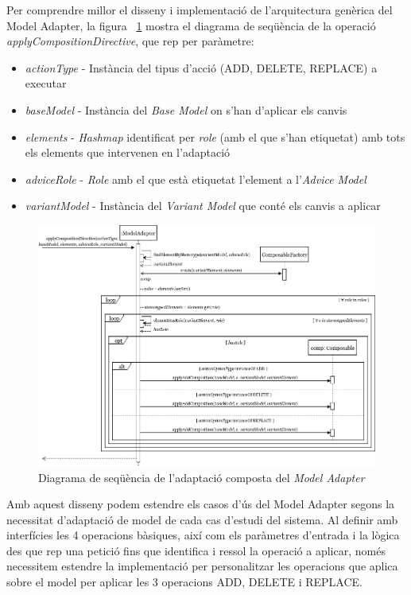 Per comprendre millor el disseny i implementació de l'arquitectura genèrica del Model Adapter, la figura ~\ref{fig:Figura30} mostra el diagrama de seqüència de la operació \textit{applyCompositionDirective}, que rep per paràmetre:

\begin{itemize}
\item \textit{actionType} - Instància del tipus d'acció (ADD, DELETE, REPLACE) a executar
\item \textit{baseModel} - Instància del \textit{Base Model} on s'han d'aplicar els canvis
\item \textit{elements} - \textit{Hashmap} identificat per \textit{role} (amb el que s'han etiquetat) amb tots els elements que intervenen en l'adaptació
\item \textit{adviceRole} - \textit{Role} amb el que està etiquetat l'element a l'\textit{Advice Model}
\item \textit{variantModel} - Instància del \textit{Variant Model} que conté els canvis a aplicar
\end{itemize}

\begin{figure}
\centering
\includegraphics[width=14cm]{Figures/Figure30}
\decoRule
\caption{Diagrama de seqüència de l'adaptació composta del \textit{Model Adapter}}
\label{fig:Figura30}
\end{figure}

Amb aquest disseny podem estendre els casos d'ús del Model Adapter segons la necessitat d'adaptació de model de cada cas d'estudi del sistema. Al definir amb interfícies les 4 operacions bàsiques, així com els paràmetres d'entrada i la lògica des que rep una petició fins que identifica i ressol la operació a aplicar, només necessitem estendre la implementació per personalitzar les operacions que aplica sobre el model per aplicar les 3 operacions ADD, DELETE i REPLACE.\\

